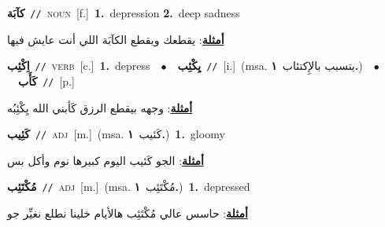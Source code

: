 \documentclass[10pt,a4paper,twoside]{article} %
\begin{document}
\begin{multicols}{2}
{\setlength\topsep{0pt}\textbf{\foreignlanguage{arabic}{كآبَة}}\ {\color{gray}\texttt{//}\color{black}}\ \textsc{noun}\ [f.]\ \textbf{1.}~depression  \textbf{2.}~deep sadness\  \begin{flushright}\color{gray}\foreignlanguage{arabic}{\textbf{\underline{\foreignlanguage{arabic}{أمثلة}}}: يقطعك ويقطع الكآبَة اللي أنت عايش فيها}\end{flushright}\color{black}} \vspace{2mm}

{\setlength\topsep{0pt}\textbf{\foreignlanguage{arabic}{اِكْئِب}}\ {\color{gray}\texttt{//}\color{black}}\ \textsc{verb}\ [c.]\ \textbf{1.}~depress\ \ $\bullet$\ \ \setlength\topsep{0pt}\textbf{\foreignlanguage{arabic}{يِكْئِب}}\ {\color{gray}\texttt{//}\color{black}}\ [i.]\ \color{gray}(msa. \foreignlanguage{arabic}{يتسبب بالإِكتئاب}~\foreignlanguage{arabic}{\textbf{١.}})\color{black}\ \ $\bullet$\ \ \setlength\topsep{0pt}\textbf{\foreignlanguage{arabic}{كَأَب}}\ {\color{gray}\texttt{//}\color{black}}\ [p.]\  \begin{flushright}\color{gray}\foreignlanguage{arabic}{\textbf{\underline{\foreignlanguage{arabic}{أمثلة}}}: وجهه بيقطع الرزق كَأبني الله يِكْئِبُه}\end{flushright}\color{black}} \vspace{2mm}

{\setlength\topsep{0pt}\textbf{\foreignlanguage{arabic}{كَئِيب}}\ {\color{gray}\texttt{//}\color{black}}\ \textsc{adj}\ [m.]\ \color{gray}(msa. \foreignlanguage{arabic}{كَئيب}~\foreignlanguage{arabic}{\textbf{١.}})\color{black}\ \textbf{1.}~gloomy\  \begin{flushright}\color{gray}\foreignlanguage{arabic}{\textbf{\underline{\foreignlanguage{arabic}{أمثلة}}}: الجو كَئيب اليوم كبيرها نوم وأكل بس}\end{flushright}\color{black}} \vspace{2mm}

{\setlength\topsep{0pt}\textbf{\foreignlanguage{arabic}{مُكْتَئِب}}\ {\color{gray}\texttt{//}\color{black}}\ \textsc{adj}\ [m.]\ \color{gray}(msa. \foreignlanguage{arabic}{مُكْتَئِب}~\foreignlanguage{arabic}{\textbf{١.}})\color{black}\ \textbf{1.}~depressed\  \begin{flushright}\color{gray}\foreignlanguage{arabic}{\textbf{\underline{\foreignlanguage{arabic}{أمثلة}}}: حاسس عالي مُكْتَئِب هالأيام خلينا نطلع نغيِّر جو}\end{flushright}\color{black}} \vspace{2mm}


\end{multicols}
\end{document}
